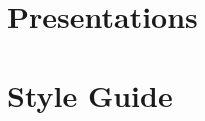 \documentclass[twoside,10pt]{book}
\begin{document}
\chapter{Presentations}
\label{sec:presentations}


\chapter{Style Guide}
\label{sec:styleguide}


\clearpage
{}
{} 
\printindex
\end{document}
